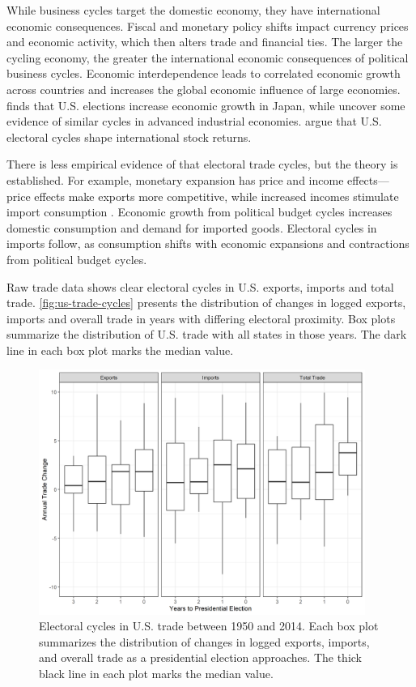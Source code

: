 \documentclass[12pt]{article}
\begin{document}
While business cycles target the domestic economy, they have international economic consequences.
Fiscal and monetary policy shifts impact currency prices and economic activity, which then alters trade and financial ties. 
The larger the cycling economy, the greater the international economic consequences of political business cycles.
Economic interdependence leads to correlated economic growth across countries \citep{ArtisZhang1999, Kayser2006} and increases the global economic influence of large economies. 
\citet{Ito1991} finds that U.S. elections increase economic growth in Japan, while \citet{ThompsonZuk1983} uncover some evidence of similar cycles in advanced industrial economies.
\citet{FoersterSchmitz1997} argue that U.S. electoral cycles shape international stock returns.



There is less empirical evidence of that electoral trade cycles, but the theory is established.
For example, monetary expansion has price and income effects--- price effects make exports more competitive, while increased incomes stimulate import consumption \citep{Sumner2021}.
Economic growth from political budget cycles increases domestic consumption and demand for imported goods. 
Electoral cycles in imports follow, as consumption shifts with economic expansions and contractions from political budget cycles.  


Raw trade data shows clear electoral cycles in U.S. exports, imports and total trade. 
\autoref{fig:us-trade-cycles} presents the distribution of changes in logged exports, imports and overall trade in years with differing electoral proximity.
Box plots summarize the distribution of U.S. trade with all states in those years. 
The dark line in each box plot marks the median value. 



\begin{figure}
\centering
\includegraphics[width=0.95\textwidth]{../figures/us-trade-cycles.png}
\caption{Electoral cycles in U.S. trade between 1950 and 2014. Each box plot summarizes the distribution of changes in logged exports, imports, and overall trade as a presidential election approaches. The thick black line in each plot marks the median value.}
\label{fig:us-trade-cycles}
\end{figure}
\end{document}
